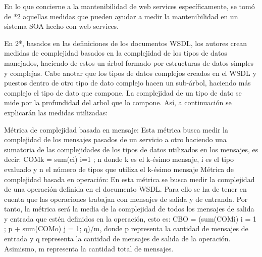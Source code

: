 En lo que concierne a la mantenibilidad de web services específicamente, se tomó de *2 aquellas medidas que pueden ayudar a medir la mantenibilidad en un sistema SOA hecho con web services. 

En 2*, basados en las definiciones de los documentos WSDL, los autores crean medidas de complejidad basados en la complejidad de los tipos de datos manejados, haciendo de estos un árbol formado por estructuras de datos simples y complejas. Cabe anotar que los tipos de datos complejos creados en el WSDL y puestos dentro de otro tipo de dato complejo hacen un sub-árbol, haciendo más complejo el tipo de dato que compone. La complejidad de un tipo de dato se mide por la profundidad del arbol que lo compone. Así, a continuación se explicarán las medidas utilizadas:

Métrica de complejidad basada en mensaje: Esta métrica busca medir la complejidad de los mensajes pasados de un servicio a otro haciendo una sumatoria de las complejidades de los tipos de datos utilizados en los mensajes, es decir: COMk = sum(ci) i=1 ; n
donde k es el k-ésimo mensaje, i es el tipo evaluado y n el número de tipos que utiliza el k-ésimo mensaje
Métrica de complejidad basada en operación: En esta métrica se busca medir la complejidad de una operación definida en el documento WSDL. Para ello se ha de tener en cuenta que las operaciones trabajan con mensajes de salida y de entranda. Por tanto, la métrica será la media de la complejidad de todos los mensajes de salida y entrada que estén definidos en la operación, esto es: CBO = (sum(COMi) i = 1 ; p + sum(COMo) j = 1; q)/m, donde p representa la cantidad de mensajes de entrada y q representa la cantidad de mensajes de salida de la operación. Asimismo, m representa la cantidad total de mensajes.
